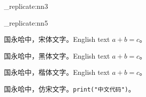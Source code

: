 \documentclass[fontset=fandol]{hithesis}
\begin{document}
\newcommand\sampleblock{%
    {\songti 国永哈中，宋体文字。English text $a+b=c$。\par}
    {\heiti 国永哈中，黑体文字。English text $a+b=c$。\par}
    {\kaishu 国永哈中，楷体文字。English text $a+b=c$。\par}
    {\fangsong 国永哈中，仿宋文字。\texttt{print("中文代码")}。\par}
}
\ExplSyntaxOn
\prg_replicate:nn{3}{\prg_replicate:nn{5}{\sampleblock}\clearpage}
\ExplSyntaxOff
\end{document}
